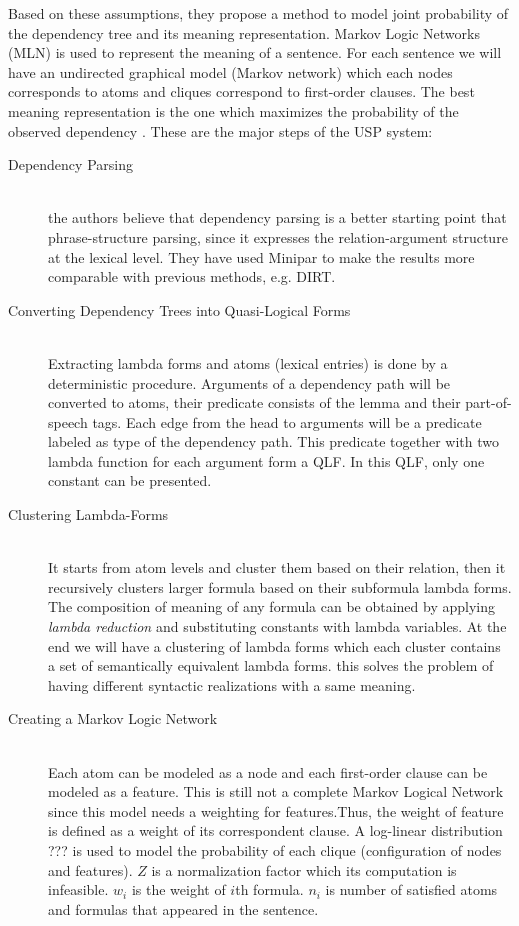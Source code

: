 Based on these assumptions, they propose a method to model joint probability of the dependency tree
and its meaning representation. Markov Logic Networks (MLN) \cite{Richardson2006} is used to represent the meaning of a sentence.
For each sentence we will have an undirected graphical model (Markov network) which each nodes corresponds to atoms
and cliques correspond to first-order clauses. The best meaning representation is the one which 
maximizes the probability of the observed dependency \cite{Titov2011}.
These are the major steps of the USP system:
\begin{description}
  \item[Dependency Parsing] \hfill \\
  the authors believe that dependency parsing is a better starting point that phrase-structure parsing, since it expresses
   the relation-argument structure at the lexical level. They have used Minipar \cite{Lin2002} to make the results more comparable with previous
   methods, e.g. DIRT.
  \item[Converting Dependency Trees into Quasi-Logical Forms] \hfill \\
  Extracting lambda forms and atoms (lexical entries) is done by a deterministic procedure. 
  Arguments of a dependency path will be converted to atoms, their predicate consists of the lemma and their part-of-speech tags.
  Each edge from the head to arguments will be a predicate labeled as type of the dependency path.
  This predicate together with two lambda function for each argument form a QLF. In this QLF, only one constant can be presented.
  
  \item[Clustering Lambda-Forms] \hfill \\
  It starts from atom levels and cluster them based on their relation, then it recursively clusters larger formula
  based on their subformula lambda forms. The composition of meaning of any formula can be obtained by applying
  \emph{lambda reduction} and substituting constants with lambda variables. At the end we will have a clustering
  of lambda forms which each cluster contains a set of semantically equivalent lambda forms. this solves
   the problem of having different syntactic realizations with a same meaning.
  
  \item[Creating a Markov Logic Network] \hfill \\
  Each atom can be modeled as a node and each first-order clause can be modeled as a feature. This is still not a complete Markov Logical
  Network since this model needs a weighting for features.Thus, the weight of feature is defined as a weight of
  its correspondent clause. A log-linear distribution ???
  is used to model the probability of each clique (configuration of nodes and features).
  $Z$ is a normalization factor which its computation is infeasible. $w_{i}$ is the weight of $i$th formula.
  $n_{i}$ is number of satisfied atoms and formulas that appeared in the sentence. 
   

\end{description}
